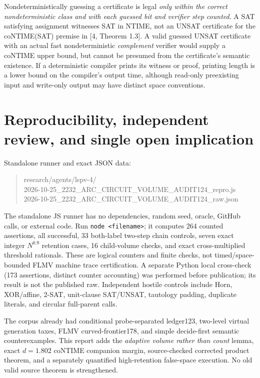 \documentclass[11pt]{article}
\begin{document}
Nondeterministically guessing a certificate is legal
\emph{only within the correct nondeterministic class and
with each guessed bit and verifier step counted}.
A SAT satisfying assignment witnesses SAT in NTIME,
not an UNSAT certificate for the coNTIME(SAT) premise
in [4, Theorem 1.3]. A valid guessed UNSAT certificate
with an actual fast nondeterministic \emph{complement}
verifier would supply a coNTIME upper bound, but cannot
be presumed from the certificate's semantic existence.
If a deterministic compiler prints its witness or proof,
printing length is a lower bound on the compiler's
output time, although read-only preexisting input and
write-only output may have distinct space conventions.

\section{Reproducibility, independent review, and single open implication}
Standalone runner and exact JSON data:
\begin{quote}\ttfamily
research/agents/lspv-4/\\
2026-10-25\_2232\_ARC\_CIRCUIT\_VOLUME\_AUDIT124\_repro.js\\
2026-10-25\_2232\_ARC\_CIRCUIT\_VOLUME\_AUDIT124\_raw.json
\end{quote}
The standalone JS runner has no dependencies, random seed, oracle,
GitHub calls, or external code. Run \texttt{node <filename>};
it computes 264 counted assertions, all successful,
33 both-label two-step chain controls, seven exact integer
$N^{0.9}$ retention cases, 16 child-volume checks, and
exact cross-multiplied threshold rationals.
These are logical counters and finite checks, not timed/space-bounded
FLMV machine trace certification. A separate Python local
cross-check (173 assertions, distinct counter accounting) was
performed before publication; its result is not the published raw.
Independent hostile controls include Horn, XOR/affine, 2-SAT,
unit-clause SAT/UNSAT, tautology padding, duplicate literals,
and circular full-parent calls.

The corpus already had conditional probe-separated ledger123,
two-level virtual generation taxes, FLMV curved-frontier178,
and simple decide-first semantic counterexamples.
This report adds the \emph{adaptive volume rather than count}
lemma, exact $d=1.802$ coNTIME companion margin,
source-checked corrected product theorem, and a separately
quantified high-retention false-space execution.
No old valid source theorem is strengthened.
\end{document}

